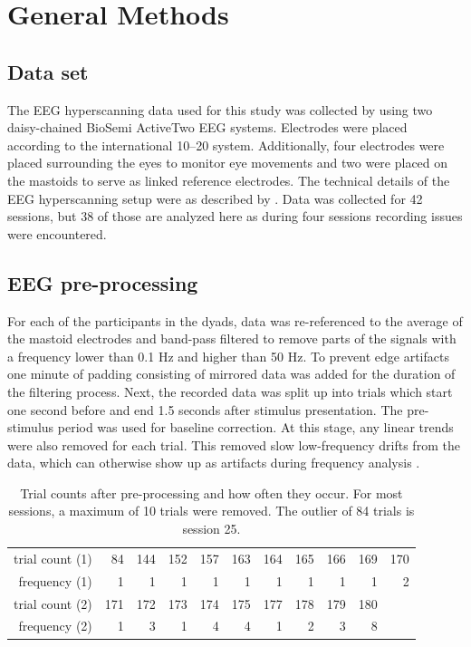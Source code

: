 
\section{General Methods}

\subsection{Data set}
The EEG hyperscanning data used for this study was collected by
\textcite{newman_effects_2021} using two daisy-chained BioSemi ActiveTwo EEG
systems. Electrodes were placed according to the international 10–20 system.
Additionally, four electrodes were placed surrounding the eyes to monitor eye
movements and two were placed on the mastoids to serve as linked reference
electrodes. The technical details of the EEG hyperscanning setup were as
described by \textcite{barraza_implementing_2019}. Data was collected for 42
sessions, but 38 of those are analyzed here as during four sessions recording
issues were encountered.

\subsection{EEG pre-processing}

For each of the participants in the dyads, data was re-referenced to the average
of the mastoid electrodes and band-pass filtered to remove parts of the signals
with a frequency lower than 0.1 Hz and higher than 50 Hz. To prevent edge
artifacts one minute of padding consisting of mirrored data was added for the
duration of the filtering process. Next, the recorded data was split up into
trials which start one second before and end 1.5 seconds after stimulus
presentation. The pre-stimulus period was used for baseline correction. At this
stage, any linear trends were also removed for each trial. This removed slow
low-frequency drifts from the data, which can otherwise show up as artifacts
during frequency analysis \parencite{schoffelen_why_2010}.

\begin{table}[!htpb]
  \caption{Trial counts after pre-processing and how often they occur. For most sessions, a maximum of 10 trials were removed. The outlier of 84 trials is session 25.}
  \label{tab:trial_counts}
  \begin{tabular}{r | r r r r r r r r r r}
    \hline
    trial count (1) & 84  & 144 & 152 & 157 & 163 & 164 & 165 & 166 & 169 & 170\\
    frequency (1)   & 1   & 1   & 1   & 1   & 1   & 1   & 1   & 1   & 1   & 2  \\\hline
    trial count (2) & 171 & 172 & 173 & 174 & 175 & 177 & 178 & 179 & 180      \\
    frequency (2)   & 1   & 3   & 1   & 4   & 4   & 1   & 2   & 3   & 8        \\\hline
  \end{tabular}
\end{table}

